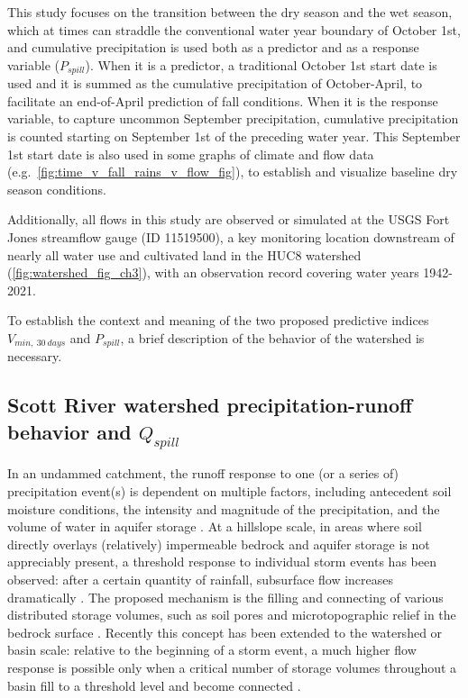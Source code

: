 \documentclass[hess, manuscript]{copernicus}
\begin{document}
This study focuses on the transition between the dry season and the wet
season, which at times can straddle the conventional water year boundary
of October 1st, and cumulative precipitation is used both as a predictor
and as a response variable (\(P_{spill}\)). When it is a predictor, a
traditional October 1st start date is used and it is summed as the
cumulative precipitation of October-April, to facilitate an end-of-April
prediction of fall conditions. When it is the response variable, to
capture uncommon September precipitation, cumulative precipitation is
counted starting on September 1st of the preceding water year. This
September 1st start date is also used in some graphs of climate and flow
data (e.g.~\autoref{fig:time_v_fall_rains_v_flow_fig}), to establish and
visualize baseline dry season conditions.

Additionally, all flows in this study are observed or simulated at the
USGS Fort Jones streamflow gauge (ID 11519500), a key monitoring
location downstream of nearly all water use and cultivated land in the
HUC8 watershed (\autoref{fig:watershed_fig_ch3}), with an observation
record covering water years 1942-2021.

To establish the context and meaning of the two proposed predictive
indices \(V_{min,~30~days}\) and \(P_{spill}\), a brief description of
the behavior of the watershed is necessary.

\subsection{\texorpdfstring{Scott River watershed precipitation-runoff
behavior and
\(Q_{spill}\)}{Scott River watershed precipitation-runoff behavior and Q\_\{spill\}}}

In an undammed catchment, the runoff response to one (or a series of)
precipitation event(s) is dependent on multiple factors, including
antecedent soil moisture conditions, the intensity and magnitude of the
precipitation, and the volume of water in aquifer storage
\citep{Tarboton2003}. At a hillslope scale, in areas where soil directly
overlays (relatively) impermeable bedrock and aquifer storage is not
appreciably present, a threshold response to individual storm events has
been observed: after a certain quantity of rainfall, subsurface flow
increases dramatically \citep{Tromp-VanMeerveld2006}. The proposed
mechanism is the filling and connecting of various distributed storage
volumes, such as soil pores and microtopographic relief in the bedrock
surface \citep{Tromp-VanMeerveld2006}. Recently this concept has been
extended to the watershed or basin scale: relative to the beginning of a
storm event, a much higher flow response is possible only when a
critical number of storage volumes throughout a basin fill to a
threshold level and become connected \citep{McDonnell2021}.
\end{document}
